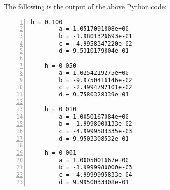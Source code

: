 \documentclass[12pt]{article}
\begin{document}
The following is the output of the above Python code:
\begin{Verbatim}[fontfamily=courier, numbers=left, numbersep=2pt, fontsize=\small]
    h = 0.100
        a = 1.0517091808e+00
        b = -1.9801326693e-01
        c = -4.9958347220e-02
        d = 9.5310179804e-01

    h = 0.050
        a = 1.0254219275e+00
        b = -9.9750416146e-02
        c = -2.4994792101e-02
        d = 9.7580328339e-01

    h = 0.010
        a = 1.0050167084e+00
        b = -1.9998000133e-02
        c = -4.9999583335e-03
        d = 9.9503308532e-01

    h = 0.001
        a = 1.0005001667e+00
        b = -1.9999980000e-03
        c = -4.9999995833e-04
        d = 9.9950033308e-01
\end{Verbatim}





































\pagebreak
\end{document}
